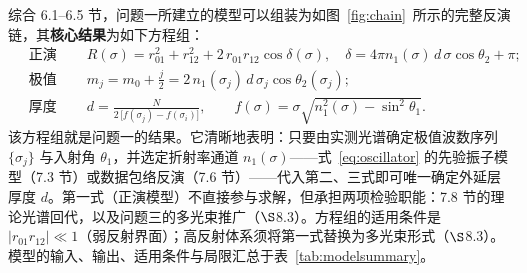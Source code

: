 \documentclass[11pt,a4paper,fontset=fandol]{ctexart}
\begin{document}
综合 6.1--6.5 节，问题一所建立的模型可以组装为如图~\ref{fig:chain}~所示的完整反演链，其\textbf{核心结果}为如下方程组：
\begin{equation}\label{eq:q1result}
\boxed{\;
\begin{aligned}
&\text{正演模型：} && R(\sigma)=r_{01}^2+r_{12}^2+2\,r_{01}r_{12}\cos\delta(\sigma),\quad
\delta=4\pi n_1(\sigma)\,d\,\sigma\cos\theta_2+\pi;\\[0.25em]
&\text{极值方程：} && m_j=m_0+\frac{j}{2}=2\,n_1(\sigma_j)\,d\,\sigma_j\cos\theta_2(\sigma_j);\\[0.25em]
&\text{厚度方程：} && d=\frac{N}{2\,\bigl[f(\sigma_j)-f(\sigma_i)\bigr]},
\qquad f(\sigma)=\sigma\sqrt{n_1^2(\sigma)-\sin^2\theta_1}.
\end{aligned}\;}
\end{equation}
该方程组就是问题一的结果。它清晰地表明：只要由实测光谱确定极值波数序列 $\{\sigma_j\}$ 与入射角 $\theta_1$，并选定折射率通道 $n_1(\sigma)$——式~\eqref{eq:oscillator} 的先验振子模型（7.3 节）或数据包络反演（7.6 节）——代入第二、三式即可唯一确定外延层厚度 $d$。第一式（正演模型）不直接参与求解，但承担两项检验职能：7.8 节的理论光谱回代，以及问题三的多光束推广（$\S$8.3）。方程组的适用条件是 $|r_{01}r_{12}|\ll1$（弱反射界面）；高反射体系须将第一式替换为多光束形式（$\S$8.3）。模型的输入、输出、适用条件与局限汇总于表~\ref{tab:modelsummary}。
\end{document}
